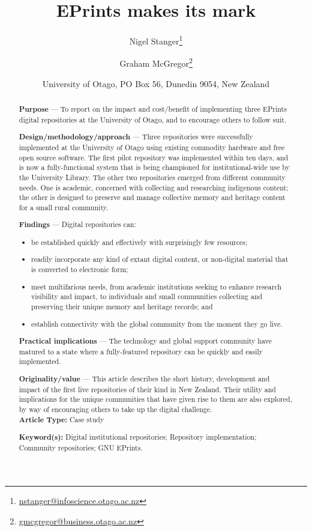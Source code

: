 \documentclass[12pt,pdftex,a4paper,titlepage]{article}
\title{EPrints makes its mark}
\author{Nigel Stanger\thanks{\protect\url{nstanger@infoscience.otago.ac.nz}} \and Graham McGregor\thanks{\protect\url{gmcgregor@business.otago.ac.nz}}}
\date{University of Otago, PO Box 56, Dunedin 9054, New Zealand}
\begin{document}
\maketitle





\begin{abstract}

\noindent\textbf{Purpose} --- To report on the impact and cost/benefit of implementing three EPrints digital repositories at the University of Otago, and to encourage others to follow suit.

\noindent\textbf{Design/methodology/approach} --- Three repositories were successfully implemented at the University of Otago using existing commodity hardware and free open source software. The first pilot repository was implemented within ten days, and is now a fully-functional system that is being championed for institutional-wide use by the University Library. The other two repositories emerged from different community needs. One is academic, concerned with collecting and researching indigenous content; the other is designed to preserve and manage collective memory and heritage content for a small rural community.

\noindent\textbf{Findings} --- Digital repositories can:
\begin{itemize}

	\item be established quickly and effectively with surprisingly few resources;
	
	\item readily incorporate any kind of extant digital content, or non-digital material that is converted to electronic form;
	
	\item meet multifarious needs, from academic institutions seeking to enhance research visibility and impact, to individuals and small communities collecting and preserving their unique memory and heritage records; and
	
	\item establish connectivity with the global community from the moment they go live.

\end{itemize}

\noindent\textbf{Practical implications} --- The technology and global support community have matured to a state where a fully-featured repository can be quickly and easily implemented.

\noindent\textbf{Originality/value} --- This article describes the short history, development and impact of the first live repositories of their kind in New Zealand. Their utility and implications for the unique communities that have given rise to them are also explored, by way of encouraging others to take up the digital challenge. \\

\noindent \textbf{Article Type:} Case study

\noindent \textbf{Keyword(s):} Digital institutional repositories; Repository implementation; Community repositories; GNU EPrints.
\end{abstract}
\end{document}

